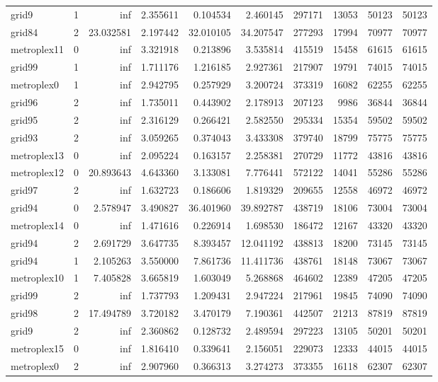 \documentclass[../../../thesis.tex]{subfiles}
\begin{document}
\begin{longtable}{|l|r|r|r|r|r|r|r|r|r|}
grid9 & 1 & inf & 2.355611 & 0.104534 & 2.460145 & 297171 & 13053 & 50123 & 50123 \\
grid84 & 2 & 23.032581 & 2.197442 & 32.010105 & 34.207547 & 277293 & 17994 & 70977 & 70977 \\
metroplex11 & 0 & inf & 3.321918 & 0.213896 & 3.535814 & 415519 & 15458 & 61615 & 61615 \\
grid99 & 1 & inf & 1.711176 & 1.216185 & 2.927361 & 217907 & 19791 & 74015 & 74015 \\
metroplex0 & 1 & inf & 2.942795 & 0.257929 & 3.200724 & 373319 & 16082 & 62255 & 62255 \\
grid96 & 2 & inf & 1.735011 & 0.443902 & 2.178913 & 207123 & 9986 & 36844 & 36844 \\
grid95 & 2 & inf & 2.316129 & 0.266421 & 2.582550 & 295334 & 15354 & 59502 & 59502 \\
grid93 & 2 & inf & 3.059265 & 0.374043 & 3.433308 & 379740 & 18799 & 75775 & 75775 \\
metroplex13 & 0 & inf & 2.095224 & 0.163157 & 2.258381 & 270729 & 11772 & 43816 & 43816 \\
metroplex12 & 0 & 20.893643 & 4.643360 & 3.133081 & 7.776441 & 572122 & 14041 & 55286 & 55286 \\
grid97 & 2 & inf & 1.632723 & 0.186606 & 1.819329 & 209655 & 12558 & 46972 & 46972 \\
grid94 & 0 & 2.578947 & 3.490827 & 36.401960 & 39.892787 & 438719 & 18106 & 73004 & 73004 \\
metroplex14 & 0 & inf & 1.471616 & 0.226914 & 1.698530 & 186472 & 12167 & 43320 & 43320 \\
grid94 & 2 & 2.691729 & 3.647735 & 8.393457 & 12.041192 & 438813 & 18200 & 73145 & 73145 \\
grid94 & 1 & 2.105263 & 3.550000 & 7.861736 & 11.411736 & 438761 & 18148 & 73067 & 73067 \\
metroplex10 & 1 & 7.405828 & 3.665819 & 1.603049 & 5.268868 & 464602 & 12389 & 47205 & 47205 \\
grid99 & 2 & inf & 1.737793 & 1.209431 & 2.947224 & 217961 & 19845 & 74090 & 74090 \\
grid98 & 2 & 17.494789 & 3.720182 & 3.470179 & 7.190361 & 442507 & 21213 & 87819 & 87819 \\
grid9 & 2 & inf & 2.360862 & 0.128732 & 2.489594 & 297223 & 13105 & 50201 & 50201 \\
metroplex15 & 0 & inf & 1.816410 & 0.339641 & 2.156051 & 229073 & 12333 & 44015 & 44015 \\
metroplex0 & 2 & inf & 2.907960 & 0.366313 & 3.274273 & 373355 & 16118 & 62307 & 62307 \\

\end{longtable}
\end{document}
